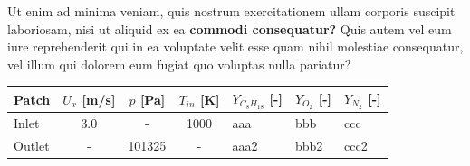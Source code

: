 Ut enim ad minima veniam, quis nostrum exercitationem ullam corporis suscipit laboriosam, nisi ut aliquid ex ea \textbf{commodi consequatur?} Quis autem vel eum iure reprehenderit qui in ea voluptate velit esse quam nihil molestiae consequatur, vel illum qui dolorem eum fugiat quo voluptas nulla pariatur?

\begin{table}[]
\centering
\begin{tabular}{l c c c l l l}
\hline
Patch  & $U_x$ [m/s] & $p$ [Pa] & $T_{in}$ [K] & $Y_{C_8 H_{18}}$ [-]  & $Y_{O_2}$ [-] & $Y_{N_2}$ [-] \\
\hline
\hline
Inlet  & 3.0         & -        & 1000         & aaa                & bbb           & ccc           \\
Outlet & -           & 101325   & -            & aaa2               & bbb2          & ccc2          \\
\hline
\end{tabular}
\end{table}
